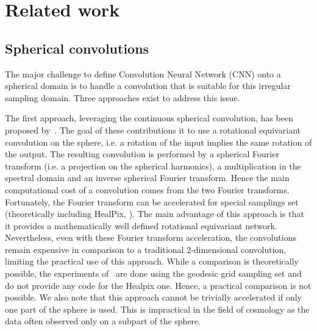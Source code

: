 \documentclass[final,twocolumn,3p,times,authoryear]{elsarticle}
\newcommand{\1}{\b{1}}              %
\newcommand{\0}{\b{0}}              %
\begin{document}


\section{Related work}
\label{sec:related}



\subsection{Spherical convolutions}
\label{sec:spherical_conv}
The major challenge to define Convolution Neural Network (CNN) onto a
spherical domain is to handle a convolution that is suitable for this irregular sampling domain.
Three approaches exist to address this issue.

The first approach, leveraging the continuous spherical convolution, has been
proposed by~\cite{cohen2017convolutional,cohen2018spherical}. The goal of
these contributions it to use a rotational equivariant convolution on the
sphere, i.e. a rotation of the input implies the same rotation of the output.
The resulting convolution is performed by a spherical Fourier transform (i.e.
a projection on the spherical harmonics), a  multiplication in the spectral
domain and an inverse spherical Fourier transform. Hence the main
computational cost of a convolution comes from the two Fourier transforms.
Fortunately, the Fourier transform can be accelerated for special samplings
set (theoretically including HealPix, \cite{mohlenkamp1999fast,rokhlin2006fast}). 
The main advantage of this
approach is that it provides a mathematically well defined rotational
equivariant network. Nevertheless, even with these Fourier transform
acceleration, the convolutions remain expensive in comparison to a traditional
2-dimensional convolution, limiting the practical use of this approach. While
a comparison is theoretically possible, the experiments
of~\cite{cohen2018spherical} are done using the geodesic grid sampling set and
do not provide any code for the Healpix one. Hence, a practical comparison is
not possible. We also note that this approach cannot be trivially accelerated
if only one part of the sphere is used. This is impractical in the field of
cosmology as the data often observed only on a subpart of the sphere.
\end{document}
